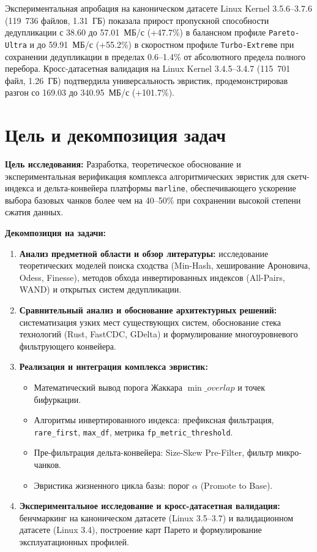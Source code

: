 \documentclass[a4paper,14pt]{extarticle}
\begin{document}
Экспериментальная апробация на каноническом датасете Linux Kernel 3.5.6--3.7.6 (119~736 файлов, 1.31~ГБ) показала прирост пропускной способности дедупликации с 38.60 до 57.01~МБ/с (+47.7\%) в балансном профиле \texttt{Pareto-Ultra} и до 59.91~МБ/с (+55.2\%) в скоростном профиле \texttt{Turbo-Extreme} при сохранении дедупликации в пределах 0.6--1.4\% от абсолютного предела полного перебора. Кросс-датасетная валидация на Linux Kernel 3.4.5--3.4.7 (115~701 файл, 1.26~ГБ) подтвердила универсальность эвристик, продемонстрировав разгон со 169.03 до 340.95~МБ/с (+101.7\%).

\newpage

\section*{Цель и декомпозиция задач}

\textbf{Цель исследования:} Разработка, теоретическое обоснование и экспериментальная верификация комплекса алгоритмических эвристик для скетч-индекса и дельта-конвейера платформы \texttt{marline}, обеспечивающего ускорение выбора базовых чанков более чем на 40--50\% при сохранении высокой степени сжатия данных.

\textbf{Декомпозиция на задачи:}
\begin{enumerate}
    \item \textbf{Анализ предметной области и обзор литературы:} исследование теоретических моделей поиска сходства (Min-Hash, хеширование Ароновича, Odess, Finesse), методов обхода инвертированных индексов (All-Pairs, WAND) и открытых систем дедупликации.
    \item \textbf{Сравнительный анализ и обоснование архитектурных решений:} систематизация узких мест существующих систем, обоснование стека технологий (Rust, FastCDC, GDelta) и формулирование многоуровневого фильтрующего конвейера.
    \item \textbf{Реализация и интеграция комплекса эвристик:}
    \begin{itemize}
        \item Математический вывод порога Жаккара $\min\_overlap$ и точек бифуркации.
        \item Алгоритмы инвертированного индекса: префиксная фильтрация, \texttt{rare\_first}, \texttt{max\_df}, метрика \texttt{fp\_metric\_threshold}.
        \item Пре-фильтрация дельта-конвейера: Size-Skew Pre-Filter, фильтр микро-чанков.
        \item Эвристика жизненного цикла базы: порог $\alpha$ (Promote to Base).
    \end{itemize}
    \item \textbf{Экспериментальное исследование и кросс-датасетная валидация:} бенчмаркинг на каноническом датасете (Linux 3.5--3.7) и валидационном датасете (Linux 3.4), построение карт Парето и формулирование эксплуатационных профилей.
\end{enumerate}
\end{document}
